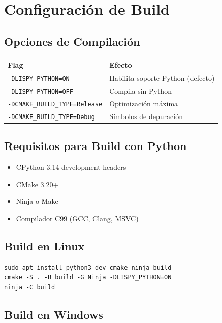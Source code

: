 \chapter{Configuración de Build}
\label{app:build}

\section*{Opciones de Compilación}

\begin{center}
\begin{tabular}{ll}
\toprule
\textbf{Flag} & \textbf{Efecto} \\
\midrule
\texttt{-DLISPY\_PYTHON=ON} & Habilita soporte Python (defecto) \\
\texttt{-DLISPY\_PYTHON=OFF} & Compila sin Python \\
\texttt{-DCMAKE\_BUILD\_TYPE=Release} & Optimización máxima \\
\texttt{-DCMAKE\_BUILD\_TYPE=Debug} & Símbolos de depuración \\
\bottomrule
\end{tabular}
\end{center}

\section*{Requisitos para Build con Python}

\begin{itemize}
\item CPython 3.14 development headers
\item CMake 3.20+
\item Ninja o Make
\item Compilador C99 (GCC, Clang, MSVC)
\end{itemize}

\section*{Build en Linux}

\begin{verbatim}
sudo apt install python3-dev cmake ninja-build
cmake -S . -B build -G Ninja -DLISPY_PYTHON=ON
ninja -C build
\end{verbatim}

\section*{Build en Windows}

